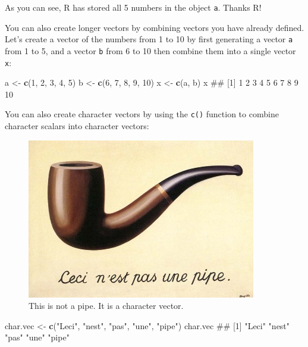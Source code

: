 \documentclass[]{book}
\newenvironment{Shaded}{\begin{snugshade}}{\end{snugshade}}
\newcommand{\KeywordTok}[1]{\textcolor[rgb]{0.13,0.29,0.53}{\textbf{{#1}}}}
\newcommand{\DecValTok}[1]{\textcolor[rgb]{0.00,0.00,0.81}{{#1}}}
\newcommand{\StringTok}[1]{\textcolor[rgb]{0.31,0.60,0.02}{{#1}}}
\newcommand{\NormalTok}[1]{{#1}}
\theoremstyle{definition}
\theoremstyle{definition}
\theoremstyle{remark}
\begin{document}
As you can see, R has stored all 5 numbers in the object \texttt{a}.
Thanks R!

You can also create longer vectors by combining vectors you have already
defined. Let's create a vector of the numbers from 1 to 10 by first
generating a vector \texttt{a} from 1 to 5, and a vector \texttt{b} from
6 to 10 then combine them into a single vector \texttt{x}:

\begin{Shaded}
\begin{Highlighting}[]
\NormalTok{a <-}\StringTok{ }\KeywordTok{c}\NormalTok{(}\DecValTok{1}\NormalTok{, }\DecValTok{2}\NormalTok{, }\DecValTok{3}\NormalTok{, }\DecValTok{4}\NormalTok{, }\DecValTok{5}\NormalTok{)}
\NormalTok{b <-}\StringTok{ }\KeywordTok{c}\NormalTok{(}\DecValTok{6}\NormalTok{, }\DecValTok{7}\NormalTok{, }\DecValTok{8}\NormalTok{, }\DecValTok{9}\NormalTok{, }\DecValTok{10}\NormalTok{)}
\NormalTok{x <-}\StringTok{ }\KeywordTok{c}\NormalTok{(a, b)}
\NormalTok{x}
\NormalTok{##  [1]  1  2  3  4  5  6  7  8  9 10}
\end{Highlighting}
\end{Shaded}

You can also create character vectors by using the \texttt{c()} function
to combine character scalars into character vectors:

\begin{figure}

{\centering \includegraphics[width=0.5\linewidth]{images/magrittepipe} 

}

\caption{This is not a pipe. It is a character vector.}\label{fig:unnamed-chunk-86}
\end{figure}

\begin{Shaded}
\begin{Highlighting}[]
\NormalTok{char.vec <-}\StringTok{ }\KeywordTok{c}\NormalTok{(}\StringTok{"Leci"}\NormalTok{, }\StringTok{"nest"}\NormalTok{, }\StringTok{"pas"}\NormalTok{, }\StringTok{"une"}\NormalTok{, }\StringTok{"pipe"}\NormalTok{)}
\NormalTok{char.vec}
\NormalTok{## [1] "Leci" "nest" "pas"  "une"  "pipe"}
\end{Highlighting}
\end{Shaded}
\end{document}
